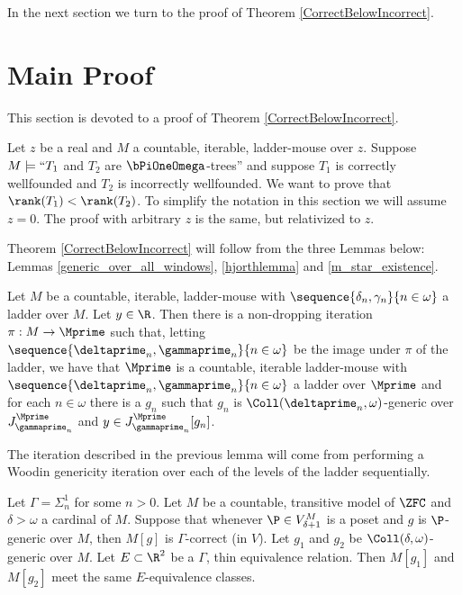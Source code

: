 \documentclass[oneside,12pt]{amsart}
\begin{document}
In the next section we turn to the proof of Theorem \ref{CorrectBelowIncorrect}.


\section{Main Proof}
\label{section:mainproof}

This section is devoted to a proof of Theorem \ref{CorrectBelowIncorrect}.

Let $z$ be a real and $M$ a countable, iterable, ladder-mouse over $z$.
Suppose $M\models ``T_1$ and $T_2$ are $\bPiOneOmega$-trees'' and
suppose $T_1$ is correctly wellfounded and
$T_2$ is incorrectly wellfounded. We want to prove that
$\rank(T_1) < \rank(T_2)$. To simplify the notation in this section we will
assume $z=0$. The proof
with arbitrary $z$ is the same, but relativized to $z$.

Theorem \ref{CorrectBelowIncorrect} will follow from the three Lemmas below:
Lemmas \ref{generic_over_all_windows}, \ref{hjorthlemma} and \ref{m_star_existence}.

\begin{lemma}
\label{generic_over_all_windows}
Let $M$ be a countable, iterable, ladder-mouse
with $\sequence{\delta_n,\gamma_n}{n\in\omega}$ a ladder over $M$.
Let $y\in\R$.
Then there is a non-dropping iteration $\pi:M\to \Mprime$ such that,
letting $\sequence{\deltaprime_n,\gammaprime_n}{n\in\omega}$ be the image under $\pi$
of the ladder, we have that $\Mprime$ is a countable, iterable ladder-mouse
with $\sequence{\deltaprime_n,\gammaprime_n}{n\in\omega}$ a ladder over $\Mprime$
and for each $n\in\omega$ there is a $g_n$ such that $g_n$
is $\Coll(\deltaprime_n,\omega)$-generic over
$J^{\Mprime}_{\gammaprime_n}$ and $y\in J^{\Mprime}_{\gammaprime_n}[g_n]$.
\end{lemma}

The iteration described in the previous lemma will come from performing a
Woodin genericity iteration over each of the levels of the ladder sequentially.

\begin{lemma}
\label{hjorthlemma}
Let $\Gamma = \Sigma^1_n$ for some $n>0$.
Let $M$ be a countable, transitive model of $\ZFC$ and  $\delta>\omega$ a cardinal of $M$.
Suppose that whenever $\P\in V^M_{\delta+1}$ is a poset and $g$ is $\P$-generic over $M$, then
$M[g]$ is $\Gamma$-correct (in $V$). Let $g_1$ and $g_2$ be $\Coll(\delta,\omega)$-generic over $M$.
Let $E\subset\R^2$ be a $\Gamma$, thin equivalence relation.
Then $M[g_1]$ and $M[g_2]$ meet the same $E$-equivalence classes.
\end{lemma}
\end{document}
